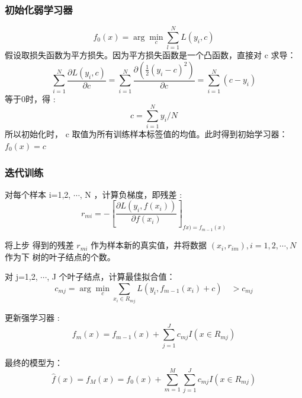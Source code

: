 \documentclass[UTF8,a4paper,AutoFakeBold,AutoFakeSlant]{article}
\begin{document}
\subsubsection{初始化弱学习器}
\begin{equation*}
  f_{0}(x)=\arg \min _{c} \sum_{l=1}^{N} L\left(y_{i}, c\right)
\end{equation*}
假设取损失函数为平方损失。因为平方损失函数是一个凸函数，直接对  c  求导：
\begin{equation*}
  \sum_{i=1}^{N} \frac{\partial L\left(y_{i}, c\right)}{\partial c}=\sum_{i=1}^{N} \frac{\partial\left(\frac{1}{2}\left(y_{i}-c\right)^{2}\right)}{\partial c}=\sum_{i=1}^{N}\left(c-y_{i}\right)
\end{equation*}
等于0时，得 :
\begin{equation*}
  c=\sum_{i=1}^{N} y_{i} / N
\end{equation*}
所以初始化时，  c  取值为所有训练样本标签值的均值。此时得到初始学习器：
$f_{0}(x)=c$


\subsubsection{迭代训练}
对每个样本  i=1,2, $\cdots$, N  ，计算负梯度，即残差 :
\begin{equation*}
  r_{m i}=-\left[\frac{\partial L\left(y_{i}, f\left(x_{i}\right)\right)}{\partial f\left(x_{i}\right)}\right]_{f x)=f_{m-1}(x)}
\end{equation*}

将上步 得到的残差  $r_{m i}$  作为样本新的真实值，井将数据  $\left(x_{i}, r_{i m}\right), i=1,2, \cdots, N$  作为下 树的叶子结点的个数。

对  j=1,2, $\cdots$, J  个叶子结点，计算最佳拟合值：
\begin{equation*}
  c_{m j}=\arg \min _{c} \sum_{x_{i} \in R_{m j}} L\left(y_{i}, f_{m-1}\left(x_{i}\right)+c\right) \quad>c_{m j}
\end{equation*}

更新强学习器 :
\begin{equation*}
  f_{m}(x)=f_{m-1}(x)+\sum_{j=1}^{J} c_{m j} I\left(x \in R_{m j}\right)
\end{equation*}

最终的模型为：
\begin{equation*}
  \hat{f}(x)=f_{M}(x)=f_{0}(x)+\sum_{m=1}^{M} \sum_{j=1}^{J} c_{m j} I\left(x \in R_{m j}\right)
\end{equation*}
\end{document}

